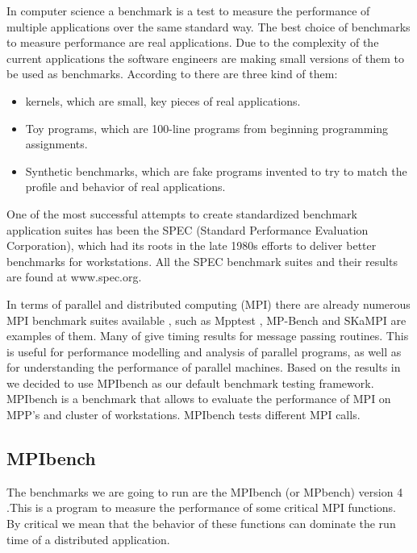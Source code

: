 In computer science a benchmark is a test to measure the performance of
multiple applications over the same standard way. The best choice of benchmarks
to measure performance are real applications. Due to the complexity of the
current applications the software engineers are making small versions of them
to be used as benchmarks. According to \cite{Hennessy} there are three kind of
them: 

\begin{itemize}
\item kernels, which are small, key pieces of real applications.
\item Toy programs, which are 100-line programs from beginning programming
assignments.
\item Synthetic benchmarks, which are fake programs invented to try to match the
profile and behavior of real applications.
\end{itemize}

One of the most successful attempts to create standardized benchmark
application suites has been the SPEC (Standard Performance Evaluation
Corporation), which had its roots in the late 1980s efforts to deliver better
benchmarks for workstations\cite{Hennessy}. All the SPEC benchmark suites and
their results are found at www.spec.org.

In terms of parallel and distributed computing (MPI) there are already numerous
MPI benchmark suites available , such as Mpptest \cite{Gropp}, MP-Bench
\cite{Calderon} and  SKaMPI \cite{Hoefler} are examples of them. Many of give
timing results for message passing routines. This is useful for performance
modelling and analysis of parallel programs, as well as for understanding the
performance of parallel machines. Based on the results in \cite{Grove} we
decided to use MPIbench as our default benchmark testing framework. MPIbench is
a benchmark that allows to evaluate the performance of MPI on MPP's and cluster
of workstations. MPIbench tests different MPI calls.

\subsection{MPIbench}
\noindent

The benchmarks we are going to run are the MPIbench (or MPbench) version 4
\cite{mpibench}.This is a program to measure the performance of some critical
MPI functions. By critical we mean that the behavior of these functions can
dominate the run time of a distributed application.

